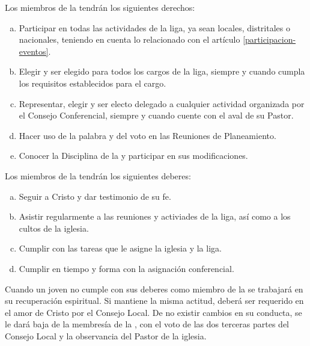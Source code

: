 

\article
Los miembros de la \LMJ{} tendrán los siguientes derechos:
\label{derechos-miembros}
\begin{enumerate}[a)]
    \item Participar en todas las actividades de la liga, ya sean locales, distritales o nacionales, teniendo en cuenta lo relacionado con el artículo \ref{participacion-eventos}.
    \item Elegir y ser elegido para todos los cargos de la liga, siempre y cuando cumpla los requisitos establecidos para el cargo.
    \item Representar, elegir y ser electo delegado a cualquier actividad organizada por el Consejo Conferencial, siempre y cuando cuente con el aval de su Pastor.
    \item Hacer uso de la palabra y del voto en las Reuniones de Planeamiento.
    \item Conocer la Disciplina de la \LMJ{} y participar en sus modificaciones.
\end{enumerate}

\article
\label{deberes-miembros}
Los miembros de la \LMJ{} tendrán los siguientes deberes:
\begin{enumerate}[a)]
    \item Seguir a Cristo y dar testimonio de su fe.
    \item Asistir regularmente a las reuniones y activiades de la liga, así como a los cultos de la iglesia.
    \item Cumplir con las tareas que le asigne la iglesia y la liga.
    \item Cumplir en tiempo y forma con la asignación conferencial.
\end{enumerate}

\article
Cuando un joven no cumple con sus deberes como miembro de la \LMJ{} se trabajará en su recuperación espiritual. Si mantiene la misma actitud, deberá ser requerido en el amor de Cristo por el Consejo Local. De no existir cambios en su conducta, se le dará baja de la membresía de la \LMJ{}, con el voto de las dos terceras partes del Consejo Local y la observancia del Pastor de la iglesia.
